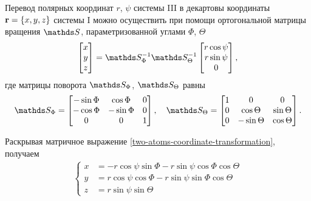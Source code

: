 Перевод полярных координат $r$, $\psi$ системы III в декартовы координаты $\mathbf{r} = \left\{ x, y, z \right\}$ системы I можно осуществить при помощи ортогональной матрицы вращения $\bbS$, параметризованной углами $\Phi$, $\Theta$ \cite{goldstein} 
\begin{gather}
    \begin{bmatrix}
        x \\ y \\ z
    \end{bmatrix} = \bbS_\Phi^{-1} \bbS_\Theta^{-1} 
    \begin{bmatrix}
        r \cos \psi \\ r \sin \psi \\ 0
    \end{bmatrix}, \label{two-atoms-coordinate-transformation}
\end{gather}
% 
где матрицы поворота $\bbS_\Phi$, $\bbS_\Theta$ равны
\begin{gather}
    \bbS_\Phi = 
    \begin{bmatrix}
       -\sin \Phi & \cos \Phi & 0 \\
       -\cos \Phi & -\sin \Phi & 0 \\
      0 & 0 & 1
    \end{bmatrix}, \quad
    \bbS_\Theta = 
    \begin{bmatrix}
        1 & 0 & 0 \\
        0 & \cos \Theta & \sin \Theta \\
        0 & -\sin \Theta & \cos \Theta
    \end{bmatrix}.
\end{gather}

Раскрывая матричное выражение \eqref{two-atoms-coordinate-transformation}, получаем 
\begin{gather}
    \left\{
        \begin{aligned}
            x &= -r \cos \psi \sin \Phi - r \sin \psi \cos \Phi \cos \Theta \\
            y &= r \cos \psi \cos \Phi - r \sin \psi \sin \Phi \cos \Theta \\
            z &= r \sin \psi \sin \Theta
        \end{aligned}
    \right. \label{two-atoms-coordinates-transformation2}
\end{gather}

